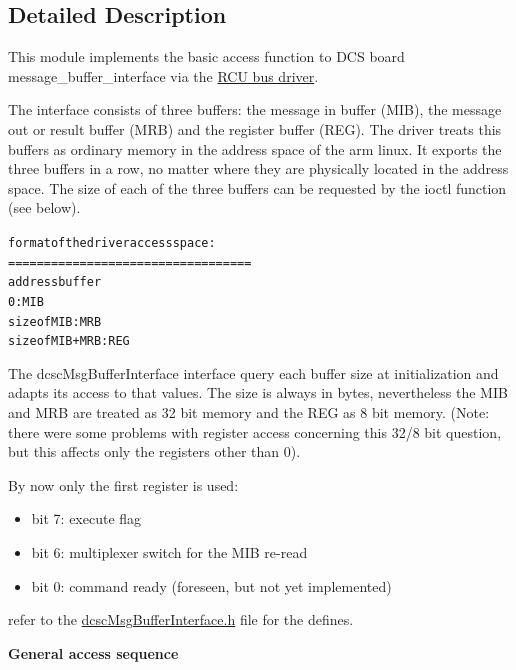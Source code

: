 \subsection{Detailed Description}
This module implements the basic access function to DCS board message\_\-buffer\_\-interface via the \hyperlink{group__rcubus__driver}{RCU bus driver}. 

The interface consists of three buffers: the message in buffer (MIB), the message out or result buffer (MRB) and the register buffer (REG). The driver treats this buffers as ordinary memory in the address space of the arm linux. It exports the three buffers in a row, no matter where they are physically located in the address space. The size of each of the three buffers can be requested by the ioctl function (see below). \par
 \small\begin{alltt}
 format of the driver access space:
 ==================================
      address        buffer
 0                 : MIB
 size of MIB       : MRB
 size of MIB + MRB : REG
 \end{alltt}\normalsize 
 The dcsc\-Msg\-Buffer\-Interface interface query each buffer size at initialization and adapts its access to that values. The size is always in bytes, nevertheless the MIB and MRB are treated as 32 bit memory and the REG as 8 bit memory. (Note: there were some problems with register access concerning this 32/8 bit question, but this affects only the registers other than 0).\par


By now only the first register is used:\begin{itemize}
\item bit 7: execute flag\item bit 6: multiplexer switch for the MIB re-read\item bit 0: command ready (foreseen, but not yet implemented)\end{itemize}


refer to the \hyperlink{dcscMsgBufferInterface_8h}{dcsc\-Msg\-Buffer\-Interface.h} file for the defines. \par


{\bf General access sequence}\par


